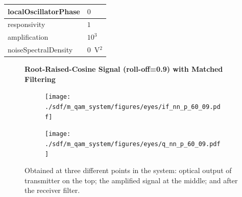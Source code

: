 \begin{table}[H]
\begin{tabular}{|l|l|}
		localOscillatorPhase   & $0$                                                        \\ \hline
		responsivity           & $1$                                                        \\ \hline
		amplification          & $10^3$                                                     \\ \hline
		noiseSpectralDensity   & $0$~V$^2$                             					\\ \hline
	\end{tabular}
\end{table}
\begin{figure}[H]
	\centering

	\textbf{Root-Raised-Cosine Signal (roll-off=0.9) with Matched Filtering}
	\begin{minipage}{\linewidth}
		\centering
	\begin{subfigure}{.45\textwidth}
		\centering
		\texttt{[image: ./sdf/m\_qam\_system/figures/eyes/if\_nn\_p\_60\_09.pdf]}
	\end{subfigure}
	\begin{subfigure}{.45\textwidth}
		\centering
		\texttt{[image: ./sdf/m\_qam\_system/figures/eyes/q\_nn\_p\_60\_09.pdf]}
	\end{subfigure}
	\caption{
		Obtained at
		three different points in the system: optical output of transmitter on the top;
		the amplified signal at the middle; and
		after the receiver filter.
		\label{fig:eyes_nn_rrc_09}}
	\end{minipage}
	
\end{figure}

